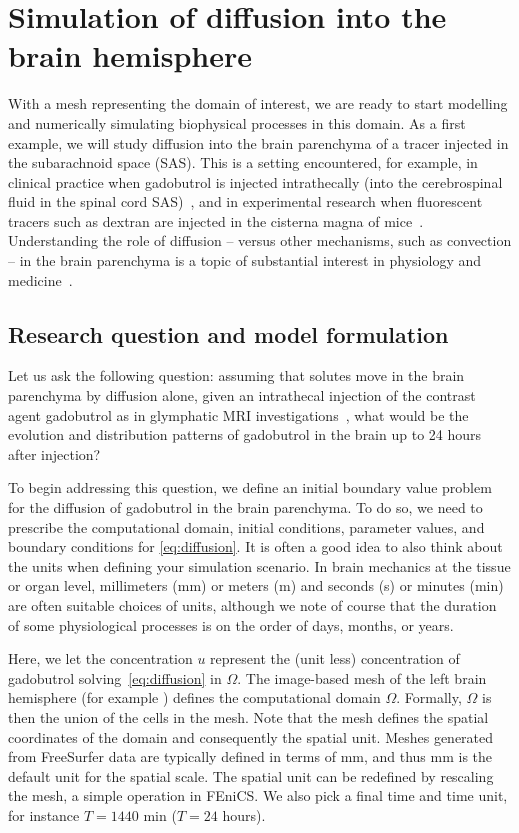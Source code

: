 \section{Simulation of diffusion into the brain hemisphere}
\label{sec:chp3:math}

With a mesh representing the domain of interest, we are ready to start
modelling and numerically simulating biophysical processes in this
domain. As a first example, we will study diffusion into the brain
parenchyma of a tracer injected in the subarachnoid space (SAS). This is a
setting encountered, for example, in clinical practice when gadobutrol is 
injected intrathecally (into the cerebrospinal fluid in the spinal
cord SAS)~\cite{ringstad2018brain}, and in experimental
research when fluorescent tracers such as dextran are injected in the
cisterna magna of mice~\cite{iliff2012paravascular,
  xie2013sleep}. Understanding the role of diffusion -- versus other
mechanisms, such as convection -- in the brain parenchyma is a topic of
substantial interest in physiology and medicine~\cite{abbott2018role}.

\subsection{Research question and model formulation}
\label{chp3:model}

Let us ask the following question: assuming that solutes move in the
brain parenchyma by diffusion alone, given an intrathecal injection of
the contrast agent gadobutrol as in glymphatic MRI
investigations~\cite{ringstad2018brain}, what would be the evolution
and distribution patterns of gadobutrol in the brain up to 24 hours
after injection?

To begin addressing this question, we define an initial boundary value
problem for the diffusion of gadobutrol in the brain parenchyma. To do
so, we need to prescribe the computational domain, initial conditions,
parameter values, and boundary conditions for \eqref{eq:diffusion}. It
is often a good idea to also think about the units when defining your
simulation scenario. In brain mechanics at the tissue or organ level,
millimeters (mm) or meters (m) and seconds (s) or minutes (min) are
often suitable choices of units, although we note of course that the
duration of some physiological processes is on the order of days,
months, or years.

Here, we let the concentration $u$ represent the (unit less)
concentration of gadobutrol solving~\eqref{eq:diffusion} in
$\Omega$. The image-based mesh of the left brain hemisphere (for
example ) defines the computational domain
$\Omega$. Formally, $\Omega$ is then the union of the cells in the
mesh. Note that the mesh defines the spatial coordinates of the domain
and consequently the spatial unit. Meshes generated from FreeSurfer
data are typically defined in terms of mm, and thus mm is the default
unit for the spatial scale. The spatial unit can be redefined by
rescaling the mesh, a simple operation in FEniCS. We also
pick a final time and time unit, for instance $T = 1440$ min ($T = 24$
hours).

